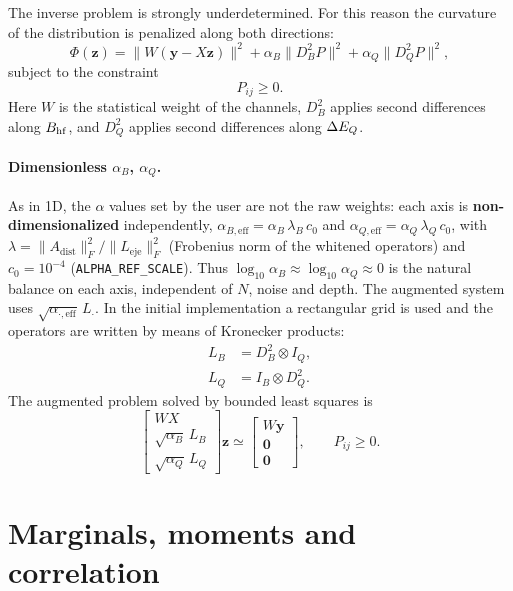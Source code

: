 The inverse problem is strongly underdetermined. For this reason the curvature
of the distribution is penalized along both directions:
\begin{equation}
  \Phi(\bm z)=\|W(\bm y-X\bm z)\|^2
  +\alpha_B\|D_B^2 P\|^2
  +\alpha_Q\|D_Q^2 P\|^2,
\end{equation}
subject to the constraint
\begin{equation}
  P_{ij}\ge 0.
\end{equation}
Here $W$ is the statistical weight of the channels, $D_B^2$ applies second
differences along $B_{\mathrm{hf}}$, and $D_Q^2$ applies second differences along $\Delta E_Q$.

\paragraph{Dimensionless $\alpha_B$, $\alpha_Q$.} As in 1D, the $\alpha$ values
set by the user are not the raw weights: each axis is
\textbf{non-dimensionalized} independently,
$\alpha_{B,\text{eff}}=\alpha_B\,\lambda_B\,c_0$ and
$\alpha_{Q,\text{eff}}=\alpha_Q\,\lambda_Q\,c_0$, with
$\lambda=\lVert A_{\text{dist}}\rVert_F^2/\lVert L_{\text{eje}}\rVert_F^2$
(Frobenius norm of the whitened operators) and $c_0=10^{-4}$
(\texttt{\small ALPHA\_REF\_SCALE}). Thus $\log_{10}\alpha_B\approx\log_{10}\alpha_Q\approx0$
is the natural balance on each axis, independent of $N$, noise and depth.
The augmented system uses $\sqrt{\alpha_{\cdot,\text{eff}}}\,L_\cdot$. In the
initial implementation a rectangular grid is used and the operators are written
by means of Kronecker products:
\begin{align}
  L_B &= D_B^2\otimes I_Q,\\
  L_Q &= I_B\otimes D_Q^2.
\end{align}
The augmented problem solved by bounded least squares is
\begin{equation}
  \begin{bmatrix}
    WX\\
    \sqrt{\alpha_B}\,L_B\\
    \sqrt{\alpha_Q}\,L_Q
  \end{bmatrix}\bm z
  \simeq
  \begin{bmatrix}
    W\bm y\\
    \bm 0\\
    \bm 0
  \end{bmatrix},
  \qquad P_{ij}\ge 0.
\end{equation}

\section{Marginals, moments and correlation}

